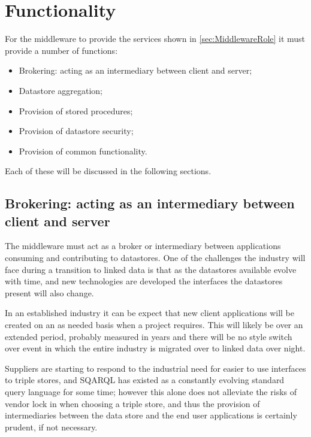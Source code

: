 \section{Functionality}
\label{sec:function}

For the middleware to provide the services shown in \autoref{sec:MiddlewareRole} it must provide a number of functions:
\begin{itemize} 
    \item Brokering: acting as an intermediary between client and server;
    \item Datastore aggregation;
    \item Provision of stored procedures;
    \item Provision of datastore security;
    \item Provision of common functionality.
\end{itemize}

Each of these will be discussed in the following sections.

\subsection {Brokering: acting as an intermediary between client and server}
The middleware must act as a broker or intermediary between applications consuming and contributing to datastores. One of the challenges the industry will face during a transition to linked data is that as the datastores available evolve with time, and new technologies are developed the interfaces the datastores present will also change.

In an established industry it can be expect that new client applications will be created on an as needed basis when a project requires. This will likely be over an extended period, probably measured in years and there will be no  style switch over event in which the entire industry is migrated over to linked data over night. 

Suppliers are starting to respond to the industrial need for easier to use interfaces to triple stores, and SQARQL has existed as a constantly evolving standard query language for some time; however this alone does not alleviate the risks of vendor lock in when choosing a triple store, and thus the provision of intermediaries between the data store and the end user applications is certainly prudent, if not necessary.


